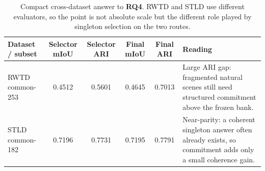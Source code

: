 \begin{table}[t]
\centering
\scriptsize
\begin{tabularx}{\textwidth}{@{}XccccX@{}}
\toprule
Dataset / subset & Selector mIoU & Selector ARI & Final mIoU & Final ARI & Reading \\
\midrule
RWTD common-253 & 0.4512 & 0.5601 & 0.4645 & 0.7013 & Large ARI gap: fragmented natural scenes still need structured commitment above the frozen bank. \\
STLD common-182 & 0.7196 & 0.7731 & 0.7195 & 0.7791 & Near-parity: a coherent singleton answer often already exists, so commitment adds only a small coherence gain. \\
\bottomrule
\end{tabularx}
\caption{Compact cross-dataset answer to \textbf{RQ4}. RWTD and STLD use different evaluators, so the point is not absolute scale but the different role played by singleton selection on the two routes.}
\label{tab:stld_selector_contrast}
\end{table}
